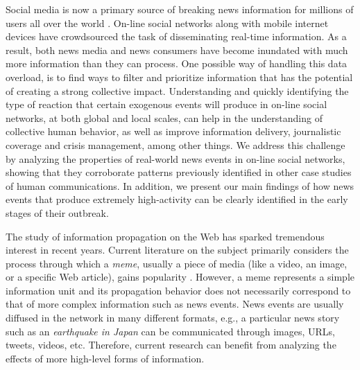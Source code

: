 Social media is now a primary source of breaking news information
for millions of users all over the world \cite{Kwak:2010}. On-line
social networks along with mobile internet devices have crowdsourced
the task of disseminating real-time information. As a result, both
news media and news consumers have become inundated with much more
information than they can process. One possible way of handling this data overload, is
to find ways to filter and prioritize information that has the
potential of creating a strong collective impact. Understanding and
quickly identifying the type of reaction that certain exogenous events will produce
in on-line social networks, at both global and local scales, can help
in the understanding of collective human behavior, as well as
improve information delivery, journalistic coverage and
crisis management, among other things. We
address this challenge by analyzing the properties of real-world news
events in on-line social networks, showing that they corroborate patterns
previously identified in other case studies of human communications. In
addition, we present our main findings of how news events that produce
extremely high-activity can be clearly identified in the early stages of
their outbreak.


The study of information propagation on the Web has sparked tremendous
interest in recent years. Current literature on the subject primarily
considers the process through which a {\em meme}, usually a piece of
media (like a video, an image, or a specific Web article), gains
popularity
\cite{Castillo:2014,Szabo:2010,Lerman:2010,Tatar2014,Pinto:2013,Ahmed:2013,Li:2016:concept:drift,
Liu:2015:UN}.  
However, a meme represents a
simple information unit and its propagation behavior does not necessarily
correspond to that of more complex information such as
news events. News events are usually diffused in the network in many
different formats, e.g., a particular news story such as an {\em
  earthquake in Japan} can be communicated through images, URLs,
tweets, videos, etc. Therefore, current research can benefit from analyzing
the effects of more high-level forms of information. 

